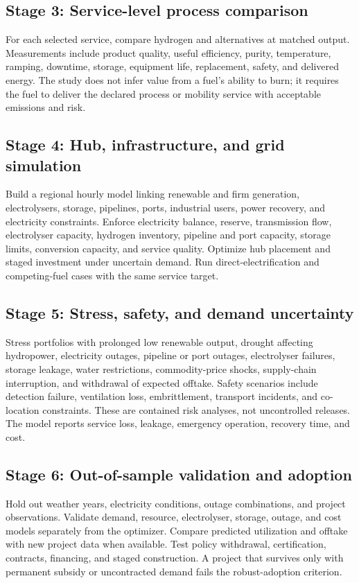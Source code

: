 \documentclass[conference]{IEEEtran}
\begin{document}
\subsection{Stage 3: Service-level process comparison}
For each selected service, compare hydrogen and alternatives at matched output. Measurements include product quality, useful efficiency, purity, temperature, ramping, downtime, storage, equipment life, replacement, safety, and delivered energy. The study does not infer value from a fuel's ability to burn; it requires the fuel to deliver the declared process or mobility service with acceptable emissions and risk.

\subsection{Stage 4: Hub, infrastructure, and grid simulation}
Build a regional hourly model linking renewable and firm generation, electrolysers, storage, pipelines, ports, industrial users, power recovery, and electricity constraints. Enforce electricity balance, reserve, transmission flow, electrolyser capacity, hydrogen inventory, pipeline and port capacity, storage limits, conversion capacity, and service quality. Optimize hub placement and staged investment under uncertain demand. Run direct-electrification and competing-fuel cases with the same service target.

\subsection{Stage 5: Stress, safety, and demand uncertainty}
Stress portfolios with prolonged low renewable output, drought affecting hydropower, electricity outages, pipeline or port outages, electrolyser failures, storage leakage, water restrictions, commodity-price shocks, supply-chain interruption, and withdrawal of expected offtake. Safety scenarios include detection failure, ventilation loss, embrittlement, transport incidents, and co-location constraints. These are contained risk analyses, not uncontrolled releases. The model reports service loss, leakage, emergency operation, recovery time, and cost.

\subsection{Stage 6: Out-of-sample validation and adoption}
Hold out weather years, electricity conditions, outage combinations, and project observations. Validate demand, resource, electrolyser, storage, outage, and cost models separately from the optimizer. Compare predicted utilization and offtake with new project data when available. Test policy withdrawal, certification, contracts, financing, and staged construction. A project that survives only with permanent subsidy or uncontracted demand fails the robust-adoption criterion.
\end{document}
